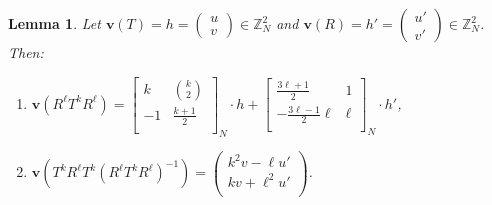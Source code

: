 \documentclass[10pt]{amsart}
\theoremstyle{plain}
\newtheorem{lemma}[theorem]{Lemma}
\theoremstyle{definition}
\theoremstyle{remark}%
\newcommand{\Z}{\mathbb{Z}}
\newcommand{\f}{\mathbf{v}}
\newcommand{\mat}[4]{\left(\begin{array}{cc}
 #1 & #2\\
 #3 & #4\\
\end{array}\right)}
\newcommand{\matN}[4]{\left[\begin{array}{cc}
 #1 & #2\\
 #3 & #4\\
\end{array}\right]_N}
\newcommand{\vc}[2]{\left(\begin{array}{c}
 #1 \\
 #2\\
\end{array}\right)}
\begin{document}
\begin{lemma}\label{5.1}
Let $\f(T)=h=\left(\begin{smallmatrix}u\\v\end{smallmatrix}\right)\in\Z_N^2$ and $\f(R)=h'=\left(\begin{smallmatrix}u'\\v'\end{smallmatrix}\right)\in\Z_N^2$. Then:
\begin{enumerate}
\item[(i)] $\f(R^\ell T^k R^\ell)=\matN{k}{{k\choose 2}}{-1}{\frac{k+1}{2}}\cdot h+\matN{\frac{3\ell+1}{2}}{1}{-\frac{3\ell-1}{2}\ell}{\ell}\cdot h'$,


\item[(ii)] $\f\left(T^k R^\ell T^k\left(R^\ell T^k R^\ell\right)^{-1}\right)=
\vc{k^2v-\ell u'}{kv+\ell^2 u'}$.
$$$$
\end{enumerate}
\end{lemma}
\end{document}
